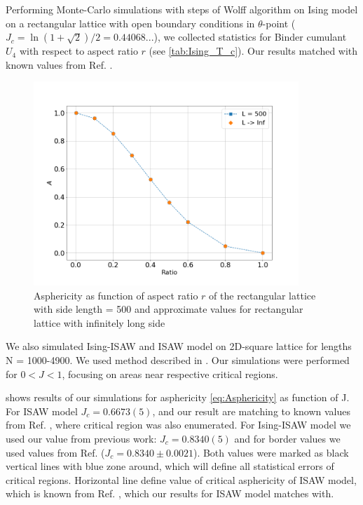 \documentclass[a4paper]{jpconf}
\begin{document}
Performing Monte-Carlo simulations with steps of Wolff algorithm \cite{Newmanb1999} on Ising model on a rectangular lattice with open boundary conditions in $\theta$-point ($J_{c} = \ln{(1 + \sqrt{2}) / 2} =  0.44068... $), we collected statistics for Binder cumulant $U_{4}$ with respect to aspect ratio $r$ (see \cref{tab:Ising_T_c}). Our results matched with known values from Ref. \cite{Selke2006}.

\begin{figure}[h]
    \centering
    \includegraphics[width=100mm]{Images/A_r.png}
    \caption{Asphericity as function of aspect ratio $r$ of the rectangular lattice with side length = 500 and approximate values for rectangular lattice with infinitely long side}
    \label{fig:A_r}
\end{figure}


We also simulated Ising-ISAW and ISAW model on 2D-square lattice for lengths N = 1000-4900.  
We used method described in \cite{faizullina2021critical}. 
Our simulations were performed for $0 < J < 1$, focusing on areas near respective critical regions.

 shows results of our simulations for asphericity \eqref{eq:Asphericity} as function of J. 
For ISAW model $J_{c} = 0.6673(5)$, and our result are matching to known values from  Ref. \cite{Caracciolo2011}, where critical region was also enumerated.
For Ising-ISAW model we used our value from previous work: $J_{c} = 0.8340(5)$ \cite{faizullina2021critical} and for border values we used values from Ref.\cite{Foster2021} ($J_{c} = 0.8340 \pm 0.0021$). 
Both values were marked as black vertical lines with blue zone around, which will define all statistical errors of critical regions. 
Horizontal line define value of critical asphericity of ISAW model, which is known from Ref. \cite{Caracciolo2011}, which our results for ISAW model matches with.
\end{document}
